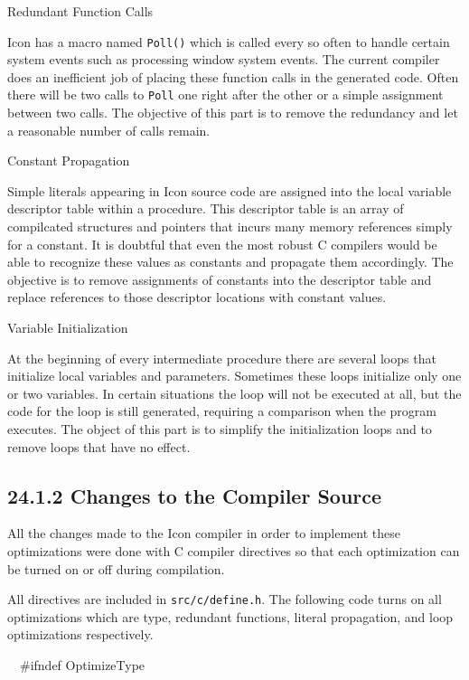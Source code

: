 {\sffamily Redundant Function Calls}

Icon has a macro named \texttt{Poll()} which is called every so often
to handle certain system events such as processing window system
events. The current compiler does an inefficient job of placing these
function calls in the generated code. Often there will be two calls to
\texttt{Poll} one right after the other or a simple assignment between
two calls. The objective of this part is to remove the redundancy and
let a reasonable number of calls remain.

{\sffamily Constant Propagation}

Simple literals appearing in Icon source code are assigned into the
local variable descriptor table within a procedure. This descriptor
table is an array of compilcated structures and pointers that incurs
many memory references simply for a constant. It is doubtful that
even the most robust C compilers would be able to recognize these
values as constants and propagate them accordingly. The objective is
to remove assignments of constants into the descriptor table and
replace references to those descriptor locations with constant values.

{\sffamily Variable Initialization}

At the beginning of every intermediate procedure there are several
loops that initialize local variables and parameters.  Sometimes these
loops initialize only one or two variables. In certain situations the
loop will not be executed at all, but the code for the loop is still
generated, requiring a comparison when the program executes. The
object of this part is to simplify the initialization loops and to
remove loops that have no effect.

\subsection[24.1.2 Changes to the Compiler Source]{24.1.2 Changes to the Compiler Source}

All the changes made to the Icon compiler in order to implement these
optimizations were done with C compiler directives so that each
optimization can be turned on or off during compilation.

All directives are included in \texttt{src/c/define.h}. The following
code turns on all optimizations which are type, redundant functions,
literal propagation, and loop optimizations respectively.

{\ttfamily\mdseries
\ \ \#ifndef OptimizeType}

